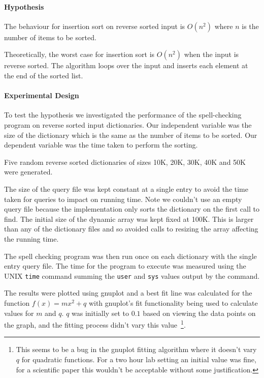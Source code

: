 \documentclass[a4]{article}
\begin{document}
\paragraph{Hypothesis} The behaviour for insertion sort on reverse sorted input is $O(n^2)$ where $n$ is the number of items to be sorted.  

Theoretically, the worst case for insertion sort is $O(n^2)$ when the input is reverse sorted.  The algorithm loops over the input and inserts each element at the end of the sorted list.

\paragraph{Experimental Design}
To test the hypothesis we investigated the performance of the spell-checking program on reverse sorted input dictionaries.  Our independent variable was the size of the dictionary which is the same as the number of items to be sorted.  Our dependent variable was the time taken to perform the sorting.

Five random reverse sorted dictionaries of sizes 10K, 20K, 30K, 40K and 50K were generated.

The size of the query file was kept constant at a single entry to avoid the time taken for queries to impact on running time.  Note we couldn't use an empty query file because the implementation only sorts the dictionary on the first call to find.  The initial size of the dynamic array was kept fixed at 100K.  This is larger than any of the dictionary files and so avoided calls to resizing the array affecting the running time.

The spell checking program was then run once on each dictionary with the single entry query file.  The time for the program to execute was measured using the UNIX \texttt{time} command summing the \texttt{user} and \texttt{sys} values output by the command.  

The results were plotted using gnuplot and a best fit line was calculated for the function $f(x) = mx^2 + q$ with gnuplot's fit functionality being used to calculate values for $m$ and $q$.  $q$ was initially set to $0.1$ based on viewing the data points on the graph, and the fitting process didn't vary this value~\footnote{This seems to be a bug in the gnuplot fitting algorithm where it doesn't vary $q$ for quadratic functions.  For a two hour lab setting an initial value was fine, for a scientific paper this wouldn't be acceptable without some justification.}.  
\end{document}
